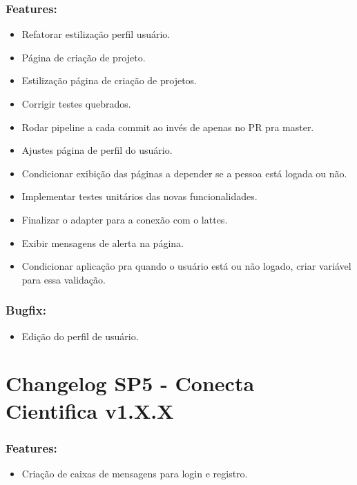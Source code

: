 \documentclass[
40pt,				%
openright,			%
oneside,			%
a4paper,			%
chapter=TITLE,		%
sumario=tradicional,
english,			%
]{abntex2}
\begin{document}
	\subsection*{\textbf{Features:}}
	\begin{itemize} \setlength\itemsep{0em}
		
		\item Refatorar estilização perfil usuário.
		\item Página de criação de projeto.
		\item Estilização página de criação de projetos.
		\item Corrigir testes quebrados.
		\item Rodar pipeline a cada commit ao invés de apenas no PR pra master.
		\item Ajustes página de perfil do usuário.
		\item Condicionar exibição das páginas a depender se a pessoa está logada ou não.
		\item Implementar testes unitários das novas funcionalidades.
		\item Finalizar o adapter para a conexão com o lattes.
		\item Exibir mensagens de alerta na página.
		\item Condicionar aplicação pra quando o usuário está ou não logado, criar variável para essa validação.

	\end{itemize}

	\subsection*{\textbf{Bugfix:}}
	\begin{itemize} \setlength\itemsep{0em}

		\item Edição do perfil de usuário.

	\end{itemize}

	\chapter*{Changelog SP5 - Conecta Cientifica v1.X.X} 
	
	\subsection*{\textbf{Features:}}
	\begin{itemize} \setlength\itemsep{0em}
		
		\item Criação de caixas de mensagens para login e registro.

	\end{itemize}
\end{document}
